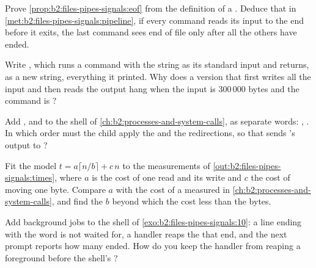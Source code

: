 \begin{exercise}[$\star\star$]\label{exo:b2:files-pipes-signals:8}
Prove \cref{prop:b2:files-pipes-signals:eof} from the definition of a . Deduce that in
\cref{met:b2:files-pipes-signals:pipeline}, if every command reads its input to the end before it exits, the last
command sees end of file only after all the others have ended.
\end{exercise}

\begin{exercise}[$\star\star$]\label{exo:b2:files-pipes-signals:9}
Write , which runs a command with the string  as its standard input
and returns, as a new string, everything it printed. Why does a version that first writes all the input and then
reads the output hang when the input is 300\,000 bytes and the command is ?
\end{exercise}

\begin{exercise}[$\star\star\star$]\label{exo:b2:files-pipes-signals:10}
Add \code{<}, \code{>} and \code{|} to the shell of \cref{ch:b2:processes-and-system-calls}, as separate words:
, . In which order must the child apply the  and the
redirections, so that  sends 's output to ?
\end{exercise}

\begin{exercise}[$\star\star\star$]\label{exo:b2:files-pipes-signals:11}
Fit the model $t = a \lceil n/b \rceil + c\,n$ to the measurements of \cref{out:b2:files-pipes-signals:times},
where $a$ is the cost of one read and its write and $c$ the cost of moving one byte. Compare $a$ with the cost of a
 measured in \cref{ch:b2:processes-and-system-calls}, and find the $b$ beyond which the  cost
less than the bytes.
\end{exercise}

\begin{exercise}[$\star\star\star$]\label{exo:b2:files-pipes-signals:12}
Add background jobs to the shell of \cref{exo:b2:files-pipes-signals:10}: a line ending with the word \code{&} is
not waited for, a  handler reaps the  that end, and the next prompt reports how many ended.
How do you keep the handler from reaping a foreground  before the shell's ?
\end{exercise}

